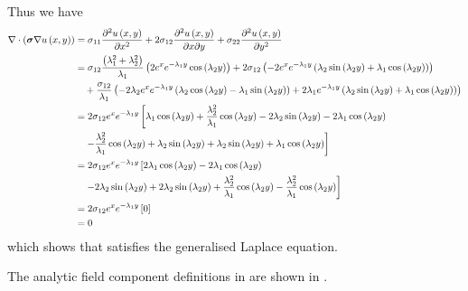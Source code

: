 Thus we have
\begin{equation}
  \begin{aligned}
    \divergence{}{\pbrac{\conductivitytensor\gradient{}\fnof{u}{x,y}}}&=\conductivitytensorsymbol_{11}\deltwosqby{\fnof{u}{x,y}}{x}+
    2\conductivitytensorsymbol_{12}\deltwoby{\fnof{u}{x,y}}{x}{y}+\conductivitytensorsymbol_{22}\deltwosqby{\fnof{u}{x,y}}{y}\\
    &=\conductivitytensorsymbol_{12}\dfrac{\pbrac{\lambda_{1}^{2}+\lambda_{2}^{2}}}{\lambda_{1}}
    \pbrac{2e^{x}e^{-\lambda_{1}{y}}\cosine{\lambda_{2}y}}+
    2\conductivitytensorsymbol_{12}\pbrac{-2e^{x}e^{-\lambda_{1}{y}}\pbrac{\lambda_{2}\sine{\lambda_{2}y}+
        \lambda_{1}\cosine{\lambda_{2}y}}}\\
    &\quad+\dfrac{\conductivitytensorsymbol_{12}}{\lambda_{1}}
    \pbrac{-2\lambda_{2}e^{x}e^{-\lambda_{1}{y}}\pbrac{\lambda_{2}\cosine{\lambda_{2}y}-\lambda_{1}\sine{\lambda_{2}y}}+
      2\lambda_{1}e^{-\lambda_{1}{y}}\pbrac{\lambda_{2}\sine{\lambda_{2}y}+\lambda_{1}\cosine{\lambda_{2}y}}}\\
    &=2\conductivitytensorsymbol_{12}e^{x}e^{-\lambda_{1}y}\left[
      \lambda_{1}\cosine{\lambda_{2}y}
      +\dfrac{\lambda_{2}^{2}}{\lambda_{1}}\cosine{\lambda_{2}y}
      -2\lambda_{2}\sine{\lambda_{2}y}
      -2\lambda_{1}\cosine{\lambda_{2}y}\right.\\
      &\quad\left.-\dfrac{\lambda_{2}^{2}}{\lambda_{1}}\cosine{\lambda_{2}y}
      +\lambda_{2}\sine{\lambda_{2}y}
      +\lambda_{2}\sine{\lambda_{2}y}
      +\lambda_{1}\cosine{\lambda_{2}y}\right]\\
    &=2\conductivitytensorsymbol_{12}e^{x}e^{-\lambda_{1}y}\left[2\lambda_{1}\cosine{\lambda_{2}y}-2\lambda_{1}\cosine{\lambda_{2}y}
      \right.\\
      &\quad\left.-2\lambda_{2}\sine{\lambda_{2}y}+2\lambda_{2}\sine{\lambda_{2}y}
      +\dfrac{\lambda_{2}^{2}}{\lambda_{1}}\cosine{\lambda_{2}y}
      -\dfrac{\lambda_{2}^{2}}{\lambda_{1}}\cosine{\lambda_{2}y}\right]\\
    &=2\conductivitytensorsymbol_{12}e^{x}e^{-\lambda_{1}y}\sqbrac{0}\\
    &=0
  \end{aligned}
\end{equation}
which shows that  satisfies the generalised Laplace equation.

The analytic field component definitions in \OpenCMISS are shown in
.

